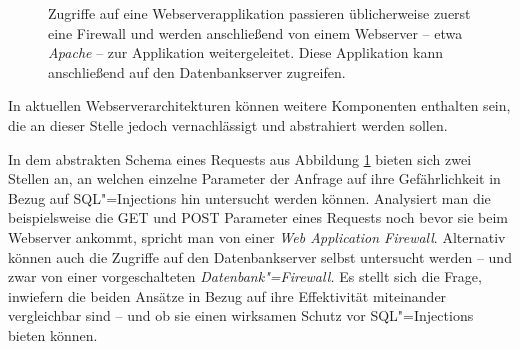 \begin{figure}
\begin{margincap}
\centering
{}

\caption{Zugriffe auf eine Webserverapplikation passieren üblicherweise zuerst eine Firewall und werden anschließend von einem Webserver -- etwa \emph{Apache} -- zur Applikation weitergeleitet. Diese Applikation kann anschließend auf den Datenbankserver zugreifen.}
\label{img:server_arch}
\end{margincap}
\end{figure}


In aktuellen Webserverarchitekturen können weitere Komponenten enthalten sein, die an dieser Stelle jedoch vernachlässigt und abstrahiert werden sollen.

In dem abstrakten Schema eines Requests aus Abbildung \ref{img:server_arch} bieten sich zwei Stellen an, an welchen einzelne Parameter der Anfrage auf ihre Gefährlichkeit in Bezug auf SQL"=Injections hin untersucht werden können. Analysiert man die beispielsweise die GET und POST Parameter eines Requests noch bevor sie beim Webserver ankommt, spricht man von einer \emph{Web Application Firewall}. Alternativ können auch die Zugriffe auf den Datenbankserver selbst untersucht werden -- und zwar von einer vorgeschalteten \emph{Datenbank"=Firewall.} Es stellt sich die Frage, inwiefern die beiden Ansätze in Bezug auf ihre Effektivität miteinander vergleichbar sind -- und ob sie einen wirksamen Schutz vor SQL"=Injections bieten können.


